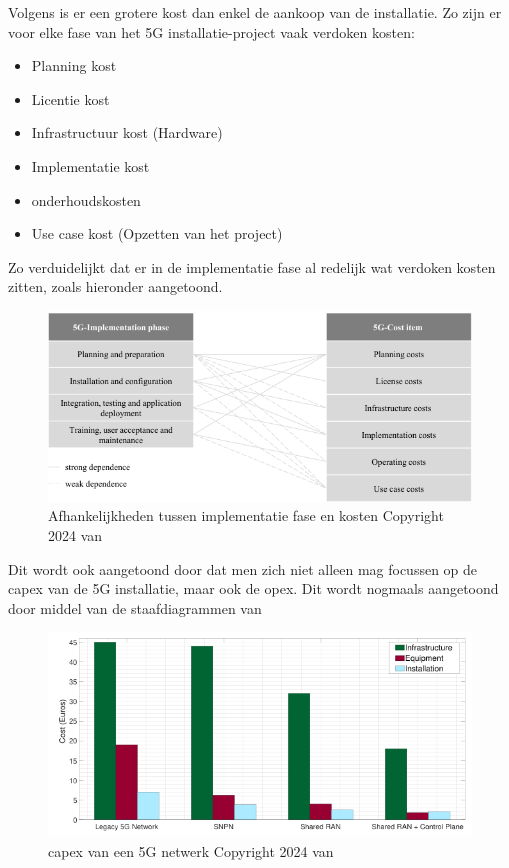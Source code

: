 Volgens \textcite{Abbas2024} is er een grotere kost dan enkel de aankoop van de installatie. Zo zijn er voor elke fase van het 5G installatie-project vaak verdoken kosten:

\begin{itemize}
  \item Planning kost
  \item Licentie kost 
  \item Infrastructuur kost (Hardware)
  \item Implementatie kost
  \item onderhoudskosten
  \item Use case kost (Opzetten van het project)
\end{itemize}

Zo verduidelijkt \textcite{Abbas2024} dat er in de implementatie fase al redelijk wat verdoken kosten zitten, zoals hieronder aangetoond.
\begin{figure}[H]
  \includegraphics[width=\linewidth]{../graphics/kost-associaties.png}
  \caption{Afhankelijkheden tussen implementatie fase en kosten \autocite[Door][]{Abbas2024} Copyright 2024 van \textcite{Abbas2024}}
  \label{fig:Cost}
\end{figure}

Dit wordt ook aangetoond door \textcite{Hilary2024} dat men zich niet alleen mag focussen op de \gls{capex} van de 5G installatie, maar ook de \gls{opex}. Dit wordt nogmaals aangetoond door middel van de staafdiagrammen van \textcite{Hilary2024}

\begin{figure}[H]
  \includegraphics[width=\linewidth]{../graphics/capex.png}
  \caption{\gls{capex} van een 5G netwerk \autocite[Door][]{Hilary2024} Copyright 2024 van \textcite{Hilary2024}}
  \label{fig:capex}
\end{figure}

